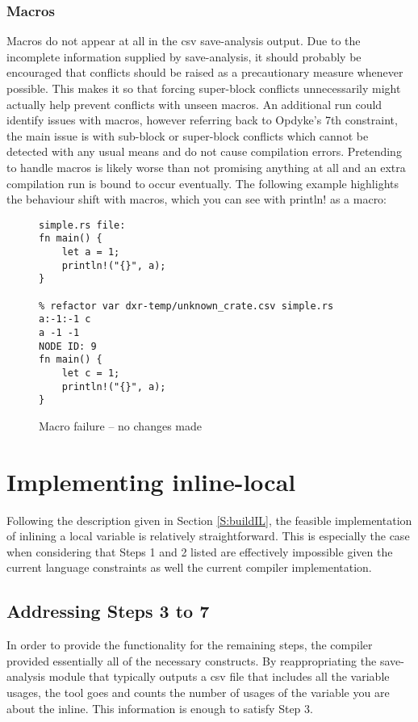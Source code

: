 \subsubsection{Macros}
Macros do not appear at all in the csv save-analysis output. Due to the incomplete information supplied by save-analysis, it should probably be encouraged that conflicts should be raised as a precautionary measure whenever possible. This makes it so that forcing super-block conflicts unnecessarily might actually help prevent conflicts with unseen macros. An additional run could identify issues with macros, however referring back to Opdyke's 7th constraint, the main issue is with sub-block or super-block conflicts which cannot be detected with any usual means and do not cause compilation errors. Pretending to handle macros is likely worse than not promising anything at all and an extra compilation run is bound to occur eventually. The following example highlights the behaviour shift with macros, which you can see with println! as a macro:

\begin{figure}[H]
\centering
\begin{verbatim}
simple.rs file:
fn main() {
    let a = 1;
    println!("{}", a);
}

% refactor var dxr-temp/unknown_crate.csv simple.rs  a:-1:-1 c
a -1 -1
NODE ID: 9
fn main() {
    let c = 1;
    println!("{}", a);
}
\end{verbatim}
\caption{Macro failure -- no changes made}
\end{figure}

\section{Implementing inline-local}\label{S:ill}
Following the description given in Section \ref{S:buildIL}, the feasible implementation of inlining a local variable is relatively straightforward. This is especially the case when considering that Steps 1 and 2 listed are effectively impossible given the current language constraints as well the current compiler implementation.

\subsection{Addressing Steps 3 to 7}
In order to provide the functionality for the remaining steps, the compiler provided essentially all of the necessary constructs. By reappropriating the save-analysis module that typically outputs a csv file that includes all the variable usages, the tool goes and counts the number of usages of the variable you are about the inline. This information is enough to satisfy Step 3.

